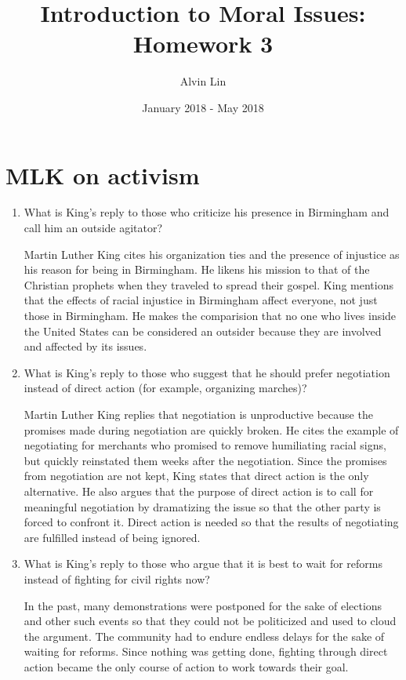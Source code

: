 \documentclass{article}
\title{Introduction to Moral Issues: Homework 3}
\author{Alvin Lin}
\date{January 2018 - May 2018}
\begin{document}
\maketitle

\section*{MLK on activism}
\begin{enumerate}
  \item What is King's reply to those who criticize his presence in Birmingham and call him an outside agitator?
  \par Martin Luther King cites his organization ties and the presence of injustice as his reason for being in Birmingham. He likens his mission to that of the Christian prophets when they traveled to spread their gospel. King mentions that the effects of racial injustice in Birmingham affect everyone, not just those in Birmingham. He makes the comparision that no one who lives inside the United States can be considered an outsider because they are involved and affected by its issues.
  \item What is King's reply to those who suggest that he should prefer negotiation instead of direct action (for example, organizing marches)?
  \par Martin Luther King replies that negotiation is unproductive because the promises made during negotiation are quickly broken. He cites the example of negotiating for merchants who promised to remove humiliating racial signs, but quickly reinstated them weeks after the negotiation. Since the promises from negotiation are not kept, King states that direct action is the only alternative. He also argues that the purpose of direct action is to call for meaningful negotiation by dramatizing the issue so that the other party is forced to confront it. Direct action is needed so that the results of negotiating are fulfilled instead of being ignored.
  \item What is King's reply to those who argue that it is best to wait for reforms instead of fighting for civil rights now?
  \par In the past, many demonstrations were postponed for the sake of elections and other such events so that they could not be politicized and used to cloud the argument. The community had to endure endless delays for the sake of waiting for reforms. Since nothing was getting done, fighting through direct action became the only course of action to work towards their goal.

\end{enumerate}
\end{document}
